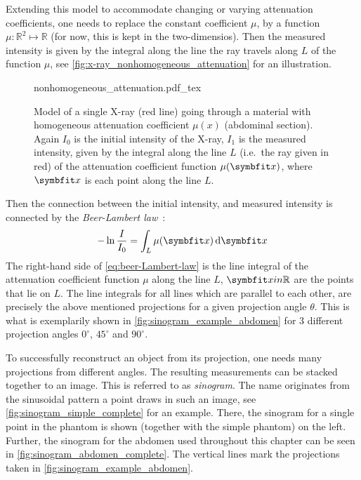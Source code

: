 Extending this model to accommodate changing or varying attenuation coefficients, one needs to
replace the constant coefficient \(\mu\), by a function \(\mu: \mathbb{R}^2 \mapsto \mathbb{R}\)
(for now, this is kept in the two-dimensios). Then the measured intensity is given by the
integral along the line the ray travels along \(L\) of the function \(\mu\), see
\autoref{fig:x-ray_nonhomogeneous_attenuation} for an illustration.

\begin{figure}
	\centering
	\def\svgwidth{0.75\textwidth}
	{nonhomogeneous_attenuation.pdf_tex}
	\caption{Model of a single X-ray (red line) going through a material with
		homogeneous attenuation coefficient \(\mu(x)\) (abdominal section). Again \(I_0\) is
		the initial intensity of the X-ray, \(I_1\) is the measured intensity, given by the
		integral along the line \(L\) (i.e.\ the ray given in red) of the attenuation
		coefficient function \(\mu(\mvec{x})\), where \(\mvec{x}\) is each point along the
		line \(L\).}\label{fig:x-ray_nonhomogeneous_attenuation}
\end{figure}

Then the connection between the initial intensity, and measured intensity is connected by the
\textit{Beer-Lambert law}~\cite{buzug_computed_2008}:
\begin{equation}\label{eq:beer-Lambert-law}
	- \ln \frac{I}{I_0} = \int_L \mu (\mvec{x}) \, \mathrm{d}\mvec{x}
\end{equation}
The right-hand side of \autoref{eq:beer-Lambert-law} is the line integral of the attenuation
coefficient function \(\mu\) along the line \(L\), \(\mvec{x} in \mathbb{R}\) are the points that
lie on \(L\). The line integrals for all lines which are parallel to each other, are precisely the
above mentioned projections for a given projection angle \(\theta\). This is what is exemplarily
shown in \autoref{fig:sinogram_example_abdomen} for 3 different projection angles \(0^\circ\),
\(45^\circ\) and \(90^\circ\).

To successfully reconstruct an object from its projection, one needs many projections from different
angles. The resulting measurements can be stacked together to an image. This is referred to as
\textit{sinogram}. The name originates from the sinusoidal pattern a point draws in such an image,
see \autoref{fig:sinogram_simple_complete} for an example. There, the sinogram for a single point in
the phantom is shown (together with the simple phantom) on the left. Further, the sinogram for the
abdomen used throughout this chapter can be seen in \autoref{fig:sinogram_abdomen_complete}. The
vertical lines mark the projections taken in \autoref{fig:sinogram_example_abdomen}.

